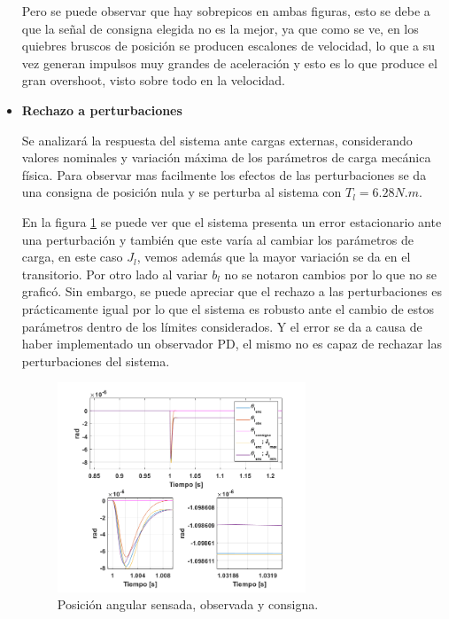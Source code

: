 \documentclass[10pt]{article}
\begin{document}
\begin{itemize}
Pero se puede observar que hay sobrepicos en ambas figuras, esto se debe a que la señal de consigna elegida no es la mejor, ya que como se ve, en los quiebres bruscos de posición
se producen escalones de velocidad, lo que a su vez generan impulsos muy grandes de aceleración y esto es lo que produce el gran overshoot, visto sobre todo en la velocidad.




	\item \textbf{Rechazo a perturbaciones}
	
	Se analizará la respuesta del sistema ante cargas externas, considerando valores nominales y variación máxima de los parámetros de carga mecánica física.
	Para observar mas facilmente los efectos de las perturbaciones se da una consigna de posición nula y se perturba al sistema con $T_{l}=6.28 N.m$.
	
	En la figura \ref{fig:perturbaciones} se puede ver que el sistema presenta un error estacionario ante una perturbación y también que este varía al cambiar los parámetros de carga, en este caso $J_{l}$, vemos además que la mayor variación se da en el transitorio. Por otro lado al variar $b_{l}$ no se notaron cambios por lo que no se graficó. Sin embargo, se puede apreciar que el rechazo a las perturbaciones es prácticamente igual 
	por lo que el sistema es robusto ante el cambio de estos parámetros dentro de los límites considerados.
	Y el error se da a causa de haber implementado un observador PD, el mismo no es capaz de rechazar las perturbaciones del sistema.
	\begin{figure}[h!]
		\centering
		\includegraphics[width=0.7\textwidth]{perturbaciones.png}
		\caption{\label{fig:perturbaciones}Posición angular sensada, observada y consigna.}
		\end{figure}
	\end{itemize}
	\newpage
\end{document}
